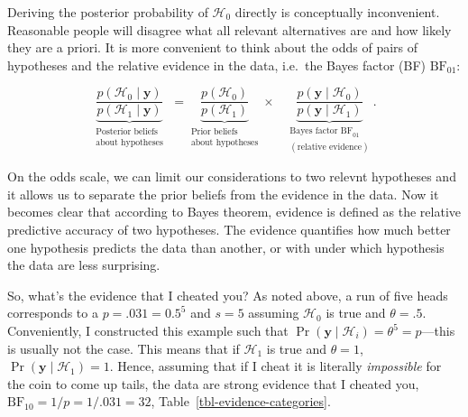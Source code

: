 \documentclass[
  man,
  floatsintext,
  longtable,
  nolmodern,
  notxfonts,
  notimes,
  colorlinks=true,linkcolor=blue,citecolor=blue,urlcolor=blue]{apa7}
\begin{document}
Deriving the posterior probability of \(\mathcal{H}_0\) directly is
conceptually inconvenient. Reasonable people will disagree what all
relevant alternatives are and how likely they are a priori. It is more
convenient to think about the odds of pairs of hypotheses and the
relative evidence in the data, i.e.~the Bayes factor (BF)
\(\text{BF}_{01}\):

\[
\underbrace{ \frac{p(\mathcal{H}_0  \mid \mathbf{y})}{p(\mathcal{H}_1  \mid \mathbf{y})}}_{\substack{\text{Posterior beliefs}\\ \text{about hypotheses}} } \,\, =
\underbrace{ \frac{p(\mathcal{H}_0)}{p(\mathcal{H}_1)}}_{\substack{\text{Prior beliefs}\\ \text{about hypotheses}} }
\times \,\,\,\,\,
\underbrace{ \frac{p(\mathbf{y} \mid \mathcal{H}_0)}{p(\mathbf{y} \mid  \mathcal{H}_1)}}_{\substack{\text{Bayes factor BF}_{01}\\(\text{relative evidence}) } }.
\]

On the odds scale, we can limit our considerations to two relevnt
hypotheses and it allows us to separate the prior beliefs from the
evidence in the data. Now it becomes clear that according to Bayes
theorem, evidence is defined as the relative predictive accuracy of two
hypotheses. The evidence quantifies how much better one hypothesis
predicts the data than another, or with under which hypothesis the data
are less surprising.

So, what's the evidence that I cheated you? As noted above, a run of
five heads corresponds to a \(p = .031 = 0.5^5\) and \(s = 5\) assuming
\(\mathcal{H}_0\) is true and \(\theta = .5\). Conveniently, I
constructed this example such that
\(\Pr(\mathbf{y} \mid \mathcal{H}_i) = \theta^5 = p\)---this is usually
not the case. This means that if \(\mathcal{H}_1\) is true and
\(\theta = 1\), \(\Pr(\mathbf{y} \mid \mathcal{H}_1) = 1\). Hence,
assuming that if I cheat it is literally \emph{impossible} for the coin
to come up tails, the data are strong evidence that I cheated you,
\(\text{BF}_{10} = 1/p = 1/.031 = 32\),
Table~\ref{tbl-evidence-categories}.
\end{document}
